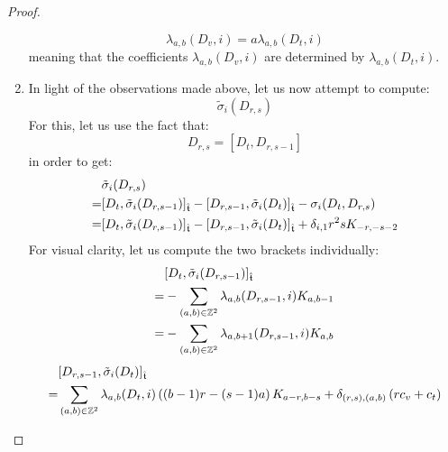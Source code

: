\begin{proof}
\begin{enumerate}
                        $$\lambda_{a, b}(D_v, i) = a\lambda_{a, b}(D_t, i)$$
                    meaning that the coefficients $\lambda_{a, b}(D_v, i)$ are determined by $\lambda_{a, b}(D_t, i)$. 
                    \item In light of the observations made above, let us now attempt to compute:
                        $$\tilde{\sigma}_i(D_{r, s})$$
                    For this, let us use the fact that:
                        $$D_{r, s} = [D_t, D_{r, s - 1}]$$
                    in order to get:
                        $$
                            \begin{aligned}
                                & \tilde{\sigma}_i(D_{r, s})
                                \\
                                = & [D_t, \tilde{\sigma}_i(D_{r, s - 1})]_{\extendedtoroidal} - [D_{r, s - 1}, \tilde{\sigma}_i(D_t)]_{\extendedtoroidal} - \sigma_i(D_t, D_{r, s})
                                \\
                                = & [D_t, \tilde{\sigma}_i(D_{r, s - 1})]_{\extendedtoroidal} - [D_{r, s - 1}, \tilde{\sigma}_i(D_t)]_{\extendedtoroidal} + \delta_{i, 1} r^2 s K_{-r, -s - 2}
                            \end{aligned}
                        $$
                    For visual clarity, let us compute the two brackets individually:
                        $$
                            \begin{aligned}
                                & [D_t, \tilde{\sigma}_i(D_{r, s - 1})]_{\extendedtoroidal}
                                \\
                                = & -\sum_{(a, b) \in \Z^2} \lambda_{a, b}(D_{r, s - 1}, i) K_{a, b - 1}
                                \\
                                = & -\sum_{(a, b) \in \Z^2} \lambda_{a, b + 1}(D_{r, s - 1}, i) K_{a, b}
                            \end{aligned}
                        $$
                        $$
                            \begin{aligned}
                                & [D_{r, s - 1}, \tilde{\sigma}_i(D_t)]_{\extendedtoroidal} 
                                \\
                                = & \sum_{(a, b) \in \Z^2} \lambda_{a, b}(D_t, i) \left( (b - 1)r - (s - 1)a \right) K_{a - r, b - s} + \delta_{(r, s), (a, b)} \left( r c_v + c_t \right)
                                \\

\end{aligned}$$
\end{enumerate}
\end{proof}
